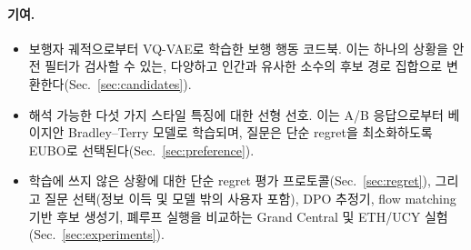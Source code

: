 \paragraph{기여.}
\begin{itemize}
  \item 보행자 궤적으로부터 VQ-VAE로 학습한 보행 행동 코드북. 이는 하나의 상황을 안전 필터가 검사할 수 있는, 다양하고 인간과 유사한
        소수의 후보 경로 집합으로 변환한다(Sec.~\ref{sec:candidates}).
  \item 해석 가능한 다섯 가지 스타일 특징에 대한 선형 선호. 이는 A/B 응답으로부터 베이지안 Bradley--Terry 모델로 학습되며,
        질문은 단순 regret을 최소화하도록 EUBO로 선택된다(Sec.~\ref{sec:preference}).
  \item 학습에 쓰지 않은 상황에 대한 단순 regret 평가 프로토콜(Sec.~\ref{sec:regret}), 그리고 질문 선택(정보 이득 및 모델 밖의 사용자 포함), DPO 추정기, flow matching 기반
        후보 생성기, 폐루프 실행을 비교하는 Grand Central 및 ETH/UCY 실험(Sec.~\ref{sec:experiments}).
\end{itemize}
